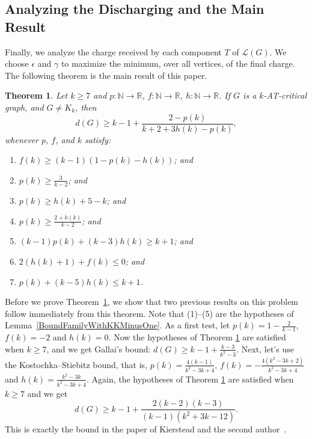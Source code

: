 \documentclass[12pt]{article}
\theoremstyle{plain}
\newtheorem{thm}{Theorem}[section]
\theoremstyle{definition}
\theoremstyle{remark}
\newcommand{\fancy}[1]{\mathcal{#1}}
\newcommand{\IN}{\mathbb{N}}
\newcommand{\IR}{\mathbb{R}}
\newcommand{\T}{\fancy{T}}
\renewcommand{\L}{\fancy{L}}
\newcommand{\func}[3]{#1\colon #2 \rightarrow #3}
\begin{document}
\subsection{Analyzing the Discharging and the Main Result}
\label{discharging-analyzing}
Finally, we analyze the charge received by each component $T$ of $\L(G)$.  We choose $\epsilon$ and $\gamma$ to maximize the minimum, over all vertices, of the final charge.  The following theorem is the main result of this paper.

\begin{thm}\label{UberTheorem}
	Let $k \ge 7$ and $\func{p}{\IN}{\IR}$, $\func{f}{\IN}{\IR}$, $\func{h}{\IN}{\IR}$.  If $G$ is a $k$-AT-critical graph, and $G\ne K_k$, then 
	\[d(G) \ge k-1 + \frac{2-p(k)}{k+2 + 3h(k) - p(k)},\]
	whenever $p$, $f$, and $k$ satisfy:
	\begin{enumerate}
	\item $f(k) \ge (k-1)(1- p(k) - h(k))$; and	
	    \item $p(k) \ge \frac{3}{k-2}$; and
		\item $p(k) \ge h(k) + 5 - k$; and
		\item $p(k) \ge \frac{2+h(k)}{k-2}$; and
		\item $(k-1)p(k) + (k-3)h(k) \ge k+1$; and
		\item $2(h(k) + 1) + f(k) \le 0$; and
		\item $p(k) + (k-5)h(k) \le k+1$.
	\end{enumerate}
\end{thm}

Before we prove Theorem~\ref{UberTheorem}, we show that two previous results on this problem follow immediately from this 
theorem.  
Note that (1)--(5) are the hypotheses of Lemma~\ref{BoundFamilyWithKKMinusOne}.
%
As a first test, let $p(k) = 1 - \frac{2}{k-1}$, $f(k) = -2$ and $h(k) = 0$.  Now the hypotheses of Theorem \ref{UberTheorem} are satisfied when $k\ge7$, and we get Gallai's bound: $d(G) \ge k-1 + \frac{k-3}{k^2-3}$. 
Next, let's use the Kostochka--Stiebitz bound, that is, $p(k) = \frac{4(k-1)}{k^2 - 3k + 4}$, $f(k) = -\frac{4(k^2-3k+2)}{k^2-3k+4}$ and $h(k) = \frac{k^2 - 3k}{k^2-3k+4}$.  Again, the hypotheses of Theorem \ref{UberTheorem} are satisfied when $k \ge 7$ and we get
\[d(G) \ge k-1 + \frac{2(k-2)(k-3)}{(k-1)(k^2 + 3k - 12)}.\]
This is exactly the bound in the paper of Kierstead and the second author~\cite{OreVizing}.  
\end{document}
